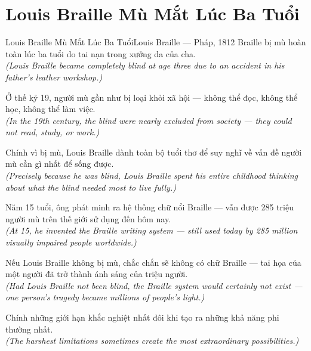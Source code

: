 \section{Louis Braille Mù Mắt Lúc Ba Tuổi}
\begin{truyen}{Louis Braille Mù Mắt Lúc Ba Tuổi}{Louis Braille --- Pháp, 1812}
 Braille bị mù hoàn toàn lúc ba tuổi do tai nạn trong xưởng da của cha.\\[4pt]
\textit{(Louis Braille became completely blind at age three due to an accident in his father's leather workshop.)}

Ở thế kỷ 19, người mù gần như bị loại khỏi xã hội --- không thể đọc, không thể học, không thể làm việc.\\[4pt]
\textit{(In the 19th century, the blind were nearly excluded from society --- they could not read, study, or work.)}

Chính vì bị mù, Louis Braille dành toàn bộ tuổi thơ để suy nghĩ về vấn đề người mù cần gì nhất để sống được.\\[4pt]
\textit{(Precisely because he was blind, Louis Braille spent his entire childhood thinking about what the blind needed most to live fully.)}

Năm 15 tuổi, ông phát minh ra hệ thống chữ nổi Braille --- vẫn được 285 triệu người mù trên thế giới sử dụng đến hôm nay.\\[4pt]
\textit{(At 15, he invented the Braille writing system --- still used today by 285 million visually impaired people worldwide.)}

Nếu Louis Braille không bị mù, chắc chắn sẽ không có chữ Braille --- tai họa của một người đã trở thành ánh sáng của triệu người.\\[4pt]
\textit{(Had Louis Braille not been blind, the Braille system would certainly not exist --- one person's tragedy became millions of people's light.)}

\end{truyen}
\begin{baihoc}
  Chính những giới hạn khắc nghiệt nhất đôi khi tạo ra những khả năng phi thường nhất.\\[4pt]
  \textit{(The harshest limitations sometimes create the most extraordinary possibilities.)}
\end{baihoc}

